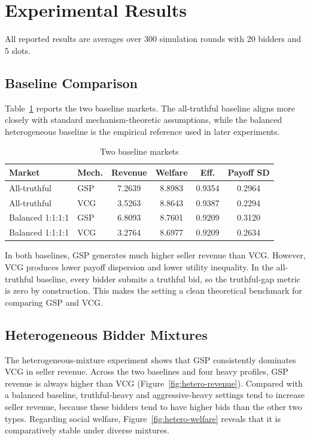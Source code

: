 \documentclass[12pt,a4paper]{article}
\begin{document}
\section{Experimental Results}

All reported results are averages over 300 simulation rounds with 20 bidders and 5 slots.

\subsection{Baseline Comparison}

Table~\ref{tab:baseline} reports the two baseline markets. The all-truthful baseline aligns more closely with standard mechanism-theoretic assumptions, while the balanced heterogeneous baseline is the empirical reference used in later experiments.

\begin{table}[t]
  \centering
  \caption{Two baseline markets}
  \label{tab:baseline}
  \small
  \begin{tabular}{llcccc}
    \toprule
    Market & Mech. & Revenue & Welfare & Eff. & Payoff SD \\
    \midrule
    All-truthful & GSP & 7.2639 & 8.8983 & 0.9354 & 0.2964 \\
    All-truthful & VCG & 3.5263 & 8.8643 & 0.9387 & 0.2294 \\
    Balanced 1:1:1:1 & GSP & 6.8093 & 8.7601 & 0.9209 & 0.3120 \\
    Balanced 1:1:1:1 & VCG & 3.2764 & 8.6977 & 0.9209 & 0.2634 \\
    \bottomrule
  \end{tabular}
\end{table}

In both baselines, GSP generates much higher seller revenue than VCG. However, VCG produces lower payoff dispersion and lower utility inequality. In the all-truthful baseline, every bidder submits a truthful bid, so the truthful-gap metric is zero by construction. This makes the setting a clean theoretical benchmark for comparing GSP and VCG.

\subsection{Heterogeneous Bidder Mixtures}

The heterogeneous-mixture experiment shows that GSP consistently dominates VCG in seller revenue. Across the two baselines and four heavy profiles, GSP revenue is always higher than VCG (Figure~\ref{fig:hetero-revenue}). Compared with a balanced baseline, truthful-heavy and aggressive-heavy settings tend to increase seller revenue, because these bidders tend to have higher bids than the other two types. Regarding social welfare, Figure~\ref{fig:hetero-welfare} reveals that it is comparatively stable under diverse mixtures.
\end{document}
